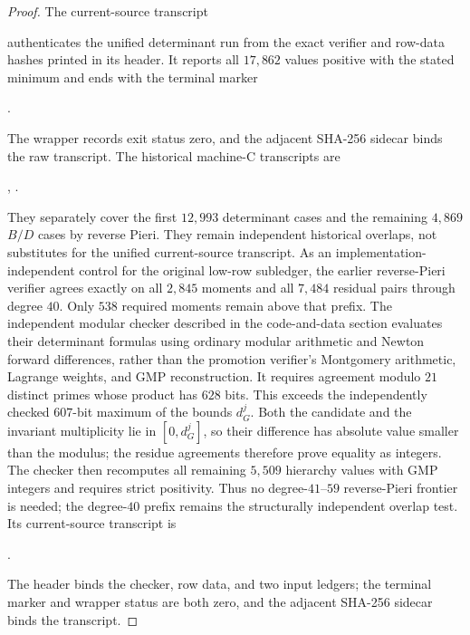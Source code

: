 \documentclass[11pt,reqno]{amsart}
\theoremstyle{plain}
\theoremstyle{definition}
\begin{document}
\begin{proof}
The current-source transcript
\begin{center}
\end{center}
authenticates the unified determinant run from the exact verifier and row-data
hashes printed in its header.  It reports all $17{,}862$ values positive with
the stated minimum and ends with the terminal marker
\begin{center}
\small{}.
\end{center}
The wrapper records exit status zero, and the adjacent SHA-256 sidecar binds
the raw transcript.  The historical machine-C transcripts are
\begin{center}
\small
{},\qquad
{}.
\end{center}
They separately cover the
first $12{,}993$ determinant cases and the remaining $4{,}869$ $B/D$ cases by
reverse Pieri.  They remain independent historical overlaps, not substitutes
for the unified current-source transcript.  As an
implementation-independent control for the original low-row subledger, the earlier
reverse-Pieri verifier agrees exactly on all $2{,}845$ moments and all
$7{,}484$ residual pairs through degree $40$.  Only $538$ required moments
remain above that prefix.  The independent modular checker described in the
code-and-data section evaluates their determinant formulas using ordinary
modular arithmetic and Newton forward differences, rather than the promotion
verifier's Montgomery arithmetic, Lagrange weights, and GMP reconstruction.
It requires agreement modulo $21$ distinct primes whose product has $628$
bits.  This exceeds the independently checked $607$-bit maximum of the bounds
$d_G^j$.  Both the candidate and the invariant multiplicity lie in
$[0,d_G^j]$, so their difference has absolute value smaller than the modulus;
the residue agreements therefore prove equality as integers.  The checker
then recomputes all remaining $5{,}509$ hierarchy values with GMP integers and
requires strict positivity.  Thus no degree-$41$--$59$ reverse-Pieri frontier
is needed; the degree-$40$ prefix remains the structurally independent overlap
test.  Its current-source transcript is
\begin{center}
\small{}.
\end{center}
The header binds the checker, row data, and two input ledgers; the terminal
marker and wrapper status are both zero, and the adjacent SHA-256 sidecar binds
the transcript.
\end{proof}
\end{document}
